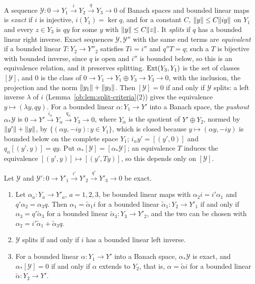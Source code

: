 A sequence $\mathcal Y\colon0\to Y_1\xrightarrow{i}Y_2\xrightarrow{q}Y_3\to0$ of Banach spaces and bounded linear maps is
\emph{exact} if $i$ is injective, $i(Y_1)=\ker q$, and for a constant $C$, $\lVert y\rVert\le C\lVert iy\rVert$ on $Y_1$ and every
$z\in Y_3$ is $qy$ for some $y$ with $\lVert y\rVert\le C\lVert z\rVert$. It \emph{splits} if $q$ has a bounded linear right inverse.
Exact sequences $\mathcal Y,\mathcal Y''$ with the same end terms are \emph{equivalent} if a bounded linear
$T\colon Y_2\to Y''_2$ satisfies $Ti=i''$ and $q''T=q$; such a $T$ is bijective with bounded inverse, since $q$ is open and
$i''$ is bounded below, so this is an equivalence relation, and it preserves splitting. $\operatorname{Ext}(Y_3,Y_1)$ is the set of
classes $[\mathcal Y]$, and $0$ is the class of $0\to Y_1\to Y_1\oplus Y_3\to Y_3\to0$, with the inclusion, the projection
and the norm $\lVert y_1\rVert+\lVert y_3\rVert$. Then $[\mathcal Y]=0$ if and only if $\mathcal Y$ splits: a left inverse $\lambda$ of
$i$ (Lemma~\ref{ob:lem:split-criteria}(2)) gives the equivalence $y\mapsto(\lambda y,qy)$. For a bounded linear
$\alpha\colon Y_1\to Y'$ into a Banach space, the \emph{pushout} $\alpha_*\mathcal Y$ is
$0\to Y'\xrightarrow{i_\alpha}Y_\alpha\xrightarrow{q_\alpha}Y_3\to0$, where $Y_\alpha$ is the quotient of $Y'\oplus Y_2$,
normed by $\lVert y'\rVert+\lVert y\rVert$, by $\{(\alpha y,-iy):y\in Y_1\}$, which is closed because $y\mapsto(\alpha y,-iy)$ is
bounded below on the complete space $Y_1$; $i_\alpha y'=[(y',0)]$ and $q_\alpha[(y',y)]=qy$. Put
$\alpha_*[\mathcal Y]=[\alpha_*\mathcal Y]$; an equivalence $T$ induces the equivalence $[(y',y)]\mapsto[(y',Ty)]$, so
this depends only on $[\mathcal Y]$.

\begin{lemma}\label{ob:lem:split-criteria}
Let $\mathcal Y$ and $\mathcal Y'\colon0\to Y'_1\xrightarrow{i'}Y'_2\xrightarrow{q'}Y'_3\to0$ be exact.
\begin{enumerate}
\item Let $\alpha_a\colon Y_a\to Y'_a$, $a=1,2,3$, be bounded linear maps with $\alpha_2i=i'\alpha_1$ and
$q'\alpha_2=\alpha_3q$. Then $\alpha_1=\tilde\alpha_1i$ for a bounded linear $\tilde\alpha_1\colon Y_2\to Y'_1$ if and only
if $\alpha_3=q'\tilde\alpha_3$ for a bounded linear $\tilde\alpha_3\colon Y_3\to Y'_2$, and the two can be chosen with
$\alpha_2=i'\tilde\alpha_1+\tilde\alpha_3q$.
\item $\mathcal Y$ splits if and only if $i$ has a bounded linear left inverse.
\item For a bounded linear $\alpha\colon Y_1\to Y'$ into a Banach space, $\alpha_*\mathcal Y$ is exact, and
$\alpha_*[\mathcal Y]=0$ if and only if $\alpha$ extends to $Y_2$, that is, $\alpha=\tilde\alpha i$ for a bounded linear
$\tilde\alpha\colon Y_2\to Y'$.
\end{enumerate}
\end{lemma}

